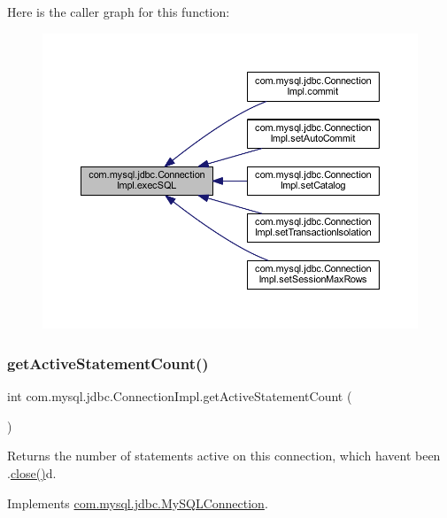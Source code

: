 Here is the caller graph for this function\+:\nopagebreak
\begin{figure}[H]
\begin{center}
\leavevmode
\includegraphics[width=350pt]{classcom_1_1mysql_1_1jdbc_1_1_connection_impl_ad757f25d671446b4bf4eec638de7ddce_icgraph}
\end{center}
\end{figure}
\mbox{\label{classcom_1_1mysql_1_1jdbc_1_1_connection_impl_ab89e48067b2d2b3e3257896c5bed6706}} 
\subsubsection{\texorpdfstring{get\+Active\+Statement\+Count()}{getActiveStatementCount()}}
{\footnotesize\ttfamily int com.\+mysql.\+jdbc.\+Connection\+Impl.\+get\+Active\+Statement\+Count (\begin{DoxyParamCaption}{ }\end{DoxyParamCaption})}

Returns the number of statements active on this connection, which haven\textquotesingle{}t been .\mbox{\hyperlink{classcom_1_1mysql_1_1jdbc_1_1_connection_impl_a9499cd266206c66001685b386c6a6b43}{close()}}d. 

Implements \mbox{\hyperlink{interfacecom_1_1mysql_1_1jdbc_1_1_my_s_q_l_connection_aa42802b4debbacd9680e2ca0b70fd53d}{com.\+mysql.\+jdbc.\+My\+S\+Q\+L\+Connection}}.

